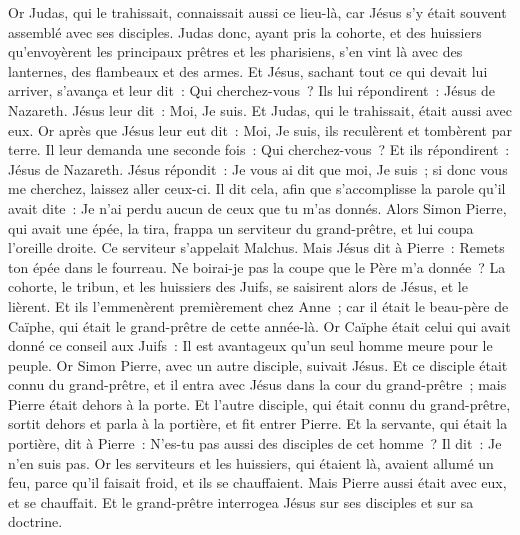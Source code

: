 \begin{multicols}{2}
Or Judas, qui le trahissait, connaissait aussi ce lieu-là, car Jésus s'y était souvent assemblé avec ses disciples.
Judas donc, ayant pris la cohorte, et des huissiers qu'envoyèrent les principaux prêtres et les pharisiens, s'en vint là avec des lanternes, des flambeaux et des armes.
Et Jésus, sachant tout ce qui devait lui arriver, s'avança et leur dit~: Qui cherchez-vous~?
Ils lui répondirent~: Jésus de Nazareth. Jésus leur dit~: Moi, Je suis. Et Judas, qui le trahissait, était aussi avec eux.
Or après que Jésus leur eut dit~: Moi, Je suis, ils reculèrent et tombèrent par terre.
Il leur demanda une seconde fois~: Qui cherchez-vous~? Et ils répondirent~: Jésus de Nazareth.
Jésus répondit~: Je vous ai dit que moi, Je suis~; si donc vous me cherchez, laissez aller ceux-ci.
Il dit cela, afin que s'accomplisse la parole qu'il avait dite~: Je n'ai perdu aucun de ceux que tu m'as donnés.
Alors Simon Pierre, qui avait une épée, la tira, frappa un serviteur du grand-prêtre, et lui coupa l'oreille droite. Ce serviteur s'appelait Malchus.
Mais Jésus dit à Pierre~: Remets ton épée dans le fourreau. Ne boirai-je pas la coupe que le Père m'a donnée~?
La cohorte, le tribun, et les huissiers des Juifs, se saisirent alors de Jésus, et le lièrent.
Et ils l'emmenèrent premièrement chez Anne~; car il était le beau-père de Caïphe, qui était le grand-prêtre de cette année-là.
Or Caïphe était celui qui avait donné ce conseil aux Juifs~: Il est avantageux qu'un seul homme meure pour le peuple.
Or Simon Pierre, avec un autre disciple, suivait Jésus. Et ce disciple était connu du grand-prêtre, et il entra avec Jésus dans la cour du grand-prêtre~;
mais Pierre était dehors à la porte. Et l'autre disciple, qui était connu du grand-prêtre, sortit dehors et parla à la portière, et fit entrer Pierre.
Et la servante, qui était la portière, dit à Pierre~: N'es-tu pas aussi des disciples de cet homme~? Il dit~: Je n'en suis pas.
Or les serviteurs et les huissiers, qui étaient là, avaient allumé un feu, parce qu'il faisait froid, et ils se chauffaient. Mais Pierre aussi était avec eux, et se chauffait.
Et le grand-prêtre interrogea Jésus sur ses disciples et sur sa doctrine.

\end{multicols}
